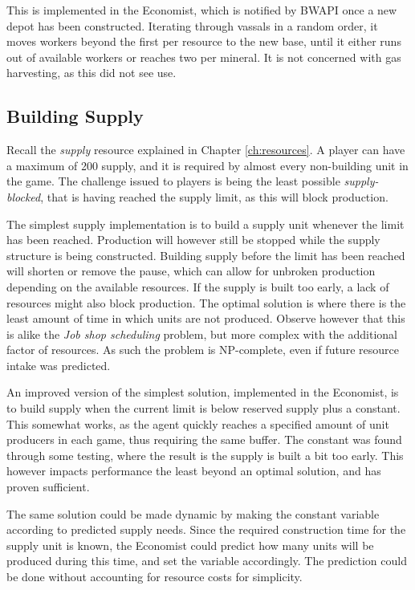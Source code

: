 	This is implemented in the Economist, which is notified by BWAPI once a new depot has been constructed. Iterating through vassals in a random order, it moves workers beyond the first per resource to the new base, until it either runs out of available workers or reaches two per mineral. It is not concerned with gas harvesting, as this did not see use.

	\subsection*{Building Supply}
	Recall the \emph{supply} resource explained in Chapter \ref{ch:resources}. A player can have a maximum of 200 supply, and it is required by almost every non-building unit in the game. The challenge issued to players is being the least possible \emph{supply-blocked}, that is having reached the supply limit, as this will block production.
	
	The simplest supply implementation is to build a supply unit whenever the limit has been reached. Production will however still be stopped while the supply structure is being constructed. Building supply before the limit has been reached will shorten or remove the pause, which can allow for unbroken production depending on the available resources. If the supply is built too early, a lack of resources might also block production. The optimal solution is where there is the least amount of time in which units are not produced. Observe however that this is alike the \emph{Job shop scheduling} problem, but more complex with the additional factor of resources. As such the problem is NP-complete, even if future resource intake was predicted.

	An improved version of the simplest solution, implemented in the Economist, is to build supply when the current limit is below reserved supply plus a constant. This somewhat works, as the agent quickly reaches a specified amount of unit producers in each game, thus requiring the same buffer. The constant was found through some testing, where the result is the supply is built a bit too early. This however impacts performance the least beyond an optimal solution, and has proven sufficient.
	
	The same solution could be made dynamic by making the constant variable according to predicted supply needs. Since the required construction time for the supply unit is known, the Economist could predict how many units will be produced during this time, and set the variable accordingly. The prediction could be done without accounting for resource costs for simplicity.
	
